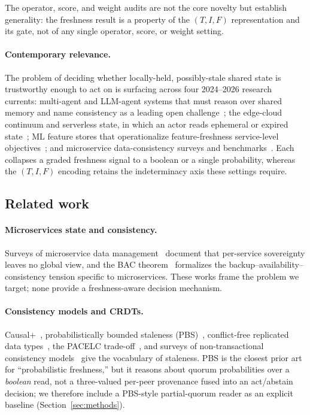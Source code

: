 \documentclass[11pt]{article}
\begin{document}
The operator, score, and weight audits are not the core novelty but establish generality: the freshness
result is a property of the $(T,I,F)$ representation and its gate, not of any single operator, score, or
weight setting.

\paragraph{Contemporary relevance.} The problem of deciding whether locally-held, possibly-stale shared
state is trustworthy enough to act on is surfacing across four 2024--2026 research currents: multi-agent
and LLM-agent systems that must reason over shared memory and name consistency as a leading open
challenge~\cite{chang2025sagallm}; the edge-cloud continuum and serverless state, in which an actor reads
ephemeral or expired state~\cite{marcelino2024goldfish}; ML feature stores that operationalize
feature-freshness service-level objectives~\cite{delarua2024hopsworks,wooders2024ralf}; and microservice
data-consistency surveys and benchmarks~\cite{laigner2021data,laigner2025marketplace,rodrigues2025slr}.
Each collapses a graded freshness signal to a boolean or a single probability, whereas the $(T,I,F)$
encoding retains the indeterminacy axis these settings require.

\subsection{Related work}
\label{sec:related}

\paragraph{Microservices state and consistency.} Surveys of microservice data
management~\cite{soldani2018pains,laigner2021data} document that per-service sovereignty leaves no
global view, and the BAC theorem~\cite{pardon2018bac} formalizes the backup--availability--consistency
tension specific to microservices. These works frame the problem we target; none provide a
freshness-aware decision mechanism.

\paragraph{Consistency models and CRDTs.} Causal+~\cite{lloyd2011cops}, probabilistically bounded
staleness (PBS)~\cite{bailis2012pbs}, conflict-free replicated data types~\cite{shapiro2011crdt,preguica2018crdt},
the PACELC trade-off~\cite{abadi2012consistency}, and surveys of non-transactional consistency
models~\cite{viotti2016consistency} give the vocabulary of staleness. PBS is the closest prior art for
``probabilistic freshness,'' but it reasons about quorum probabilities over a \emph{boolean} read,
not a three-valued per-peer provenance fused into an act/abstain decision; we therefore include a
PBS-style partial-quorum reader as an explicit baseline (Section~\ref{sec:methods}).
\end{document}
